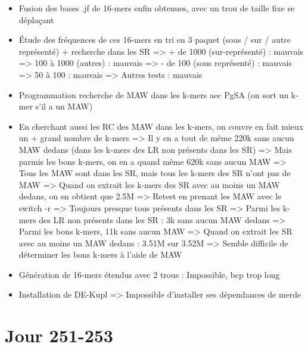 \documentclass[12pt]{report}
\begin{document}
\begin{itemize}
	\item Fusion des bases .jf de 16-mers enfin obtenues, avec un trou de taille fixe se déplaçant
	
	\item Étude des fréquences de ces 16-mers en tri en 3 paquet (sous / sur / autre représenté) + recherche
		  dans les SR
		  => + de 1000 (sur-représenté) : mauvais
		  => 100 à 1000 (autres) : mauvais
		  => - de 100 (sous représenté) : mauvais 
		  => 50 à 100 : mauvais
		  => Autres tests : mauvais
		  
	\item Programmation recherche de MAW dans les k-mers aec PgSA (on sort un k-mer s'il a un MAW)

	\item En cherchant aussi les RC des MAW dans les k-mers, on couvre en fait mieux un + grand nombre de k-mers
		  => Il y en a tout de même 220k sans aucun MAW dedans (dans les k-mers des LR non présents dans les SR)
		  => Mais parmis les bons k-mers, on en a quand même 620k sans aucun MAW
		  => Tous les MAW sont dans les SR, mais tous les k-mers des SR n'ont pas de MAW
		  	 => Quand on extrait les k-mers des SR avec au moins un MAW dedans, on en obtient que 2.5M
		  => Retest en prenant les MAW avec le switch -r 
		  	 => Toujours presque tous présents dans les SR
		  	 => Parmi les k-mers des LR non présents dans les SR : 3k sans aucun MAW dedans
		  	 => Parmi les bons k-mers, 11k sans aucun MAW
		  	 => Quand on extrait les SR avec au moins un MAW dedans : 3.51M sur 3.52M
		  => Semble difficile de déterminer les bons k-mers à l'aide de MAW
		  
	\item Génération de 16-mers étendus avec 2 trous : Impossible, bcp trop long
	
	\item Installation de DE-Kupl => Impossible d'installer ses dépendances de merde
\end{itemize}

\section{Jour 251-253}
\end{document}
